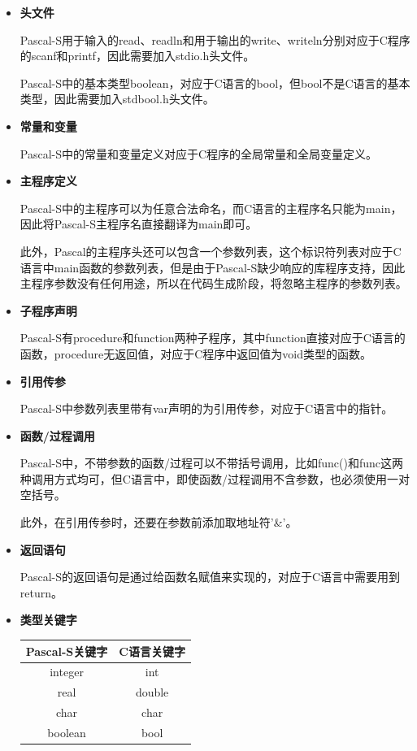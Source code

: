 \documentclass[../main.tex]{subfiles}
\begin{document}
\begin{itemize}
    \item \textbf{头文件}
    
    Pascal-S用于输入的read、readln和用于输出的write、writeln分别对应于C程序的scanf和printf，因此需要加入stdio.h头文件。
    
    Pascal-S中的基本类型boolean，对应于C语言的bool，但bool不是C语言的基本类型，因此需要加入stdbool.h头文件。

    \item \textbf{常量和变量}
    
    Pascal-S中的常量和变量定义对应于C程序的全局常量和全局变量定义。

    \item \textbf{主程序定义}
    
    Pascal-S中的主程序可以为任意合法命名，而C语言的主程序名只能为main，因此将Pascal-S主程序名直接翻译为main即可。

    此外，Pascal的主程序头还可以包含一个参数列表，这个标识符列表对应于C语言中main函数的参数列表，但是由于Pascal-S缺少响应的库程序支持，因此主程序参数没有任何用途，所以在代码生成阶段，将忽略主程序的参数列表。
    
    \item \textbf{子程序声明}
    
    Pascal-S有procedure和function两种子程序，其中function直接对应于C语言的函数，procedure无返回值，对应于C程序中返回值为void类型的函数。

    \item \textbf{引用传参}
    
    Pascal-S中参数列表里带有var声明的为引用传参，对应于C语言中的指针。

    \item \textbf{函数/过程调用}
    
    Pascal-S中，不带参数的函数/过程可以不带括号调用，比如func()和func这两种调用方式均可，但C语言中，即使函数/过程调用不含参数，也必须使用一对空括号。

    此外，在引用传参时，还要在参数前添加取地址符'\&'。

    \item \textbf{返回语句}
    
    Pascal-S的返回语句是通过给函数名赋值来实现的，对应于C语言中需要用到return。
    
    \item \textbf{类型关键字}
    \begin{table}[h]
        \centering
        \begin{tabular}{|c|c|}
        \hline
        \textbf{Pascal-S关键字} & \textbf{C语言关键字}\\
        \hline
        integer & int\\
        \hline
        real & double\\
        \hline
        char & char\\
        \hline
        boolean & bool\\
        \hline
        \end{tabular}
    \end{table}


\end{itemize}
\end{document}
